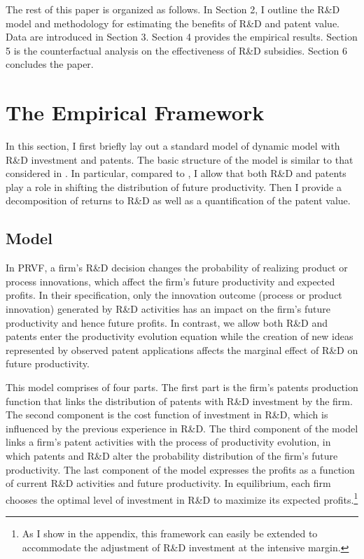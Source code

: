 \documentclass[English]{article}
\begin{document}
The rest of this paper is organized as follows. In Section 2, I outline the R\&D model and methodology for estimating the benefits of R\&D and patent value. Data are introduced in Section 3. Section 4 provides the empirical results.  Section 5 is the counterfactual analysis on the effectiveness of R\&D subsidies. Section 6 concludes the paper. 

\section{The Empirical Framework}
In this section, I first briefly lay out a standard model of dynamic model with R\&D investment and patents. The basic structure of the model is similar to that considered in \cite{Awetal.2011,Doraszelski2013,Peters2016, Peters2017}. In particular, compared to \cite{Peters2017}, I allow that both R\&D and patents play a role in shifting the distribution of future productivity. Then I provide a decomposition of returns to R\&D as well as a quantification of the patent value. 

\subsection{Model}
In PRVF, a firm's R\&D decision changes the probability of realizing product or process innovations, which affect the firm's future productivity and expected
profits. In their specification, only the innovation outcome (process or product innovation) generated by R\&D activities has an impact on the firm's future productivity and hence future profits. In contrast, we allow both R\&D and patents enter the productivity evolution equation while the creation of new ideas represented by observed patent applications affects the marginal effect of R\&D on future productivity. 

This model comprises of four parts. The first part is the firm's patents production function that links the distribution of patents with R\&D investment by the firm. The second component is the cost function of investment in R\&D, which is influenced by the previous experience in R\&D. The third component of the model links a firm's patent activities with the process of productivity evolution, in which patents and R\&D alter the probability distribution of the firm's future productivity. The last component of the model expresses the profits as a function of current R\&D activities and future productivity. In equilibrium, each firm chooses the optimal level of investment in R\&D to maximize its expected profits.\footnote{As I show in the appendix, this framework can easily be extended to accommodate the adjustment of R\&D investment at the intensive margin.}
\end{document}
